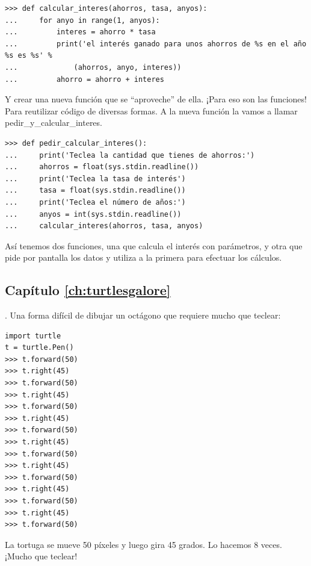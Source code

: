 \begin{listing}
\begin{verbatim}
>>> def calcular_interes(ahorros, tasa, anyos):
...     for anyo in range(1, anyos):
...         interes = ahorro * tasa
...         print('el interés ganado para unos ahorros de %s en el año %s es %s' % 
...             (ahorros, anyo, interes))
...         ahorro = ahorro + interes
\end{verbatim}
\end{listing}

\noindent
Y crear una nueva función que se ``aproveche'' de ella. ¡Para eso son las funciones! Para reutilizar código de diversas formas. A la nueva función la vamos a llamar pedir\_y\_calcular\_interes.

\begin{listing}
\begin{verbatim}
>>> def pedir_calcular_interes():
...     print('Teclea la cantidad que tienes de ahorros:')
...     ahorros = float(sys.stdin.readline())
...     print('Teclea la tasa de interés')
...     tasa = float(sys.stdin.readline())
...     print('Teclea el número de años:')
...     anyos = int(sys.stdin.readline())
...     calcular_interes(ahorros, tasa, anyos)
\end{verbatim}
\end{listing}

\noindent
Así tenemos dos funciones, una que calcula el interés con parámetros, y otra que pide por pantalla los datos y utiliza a la primera para efectuar los cálculos.

\subsection*{Capítulo \ref{ch:turtlesgalore}}

. Una forma difícil de dibujar un octágono que requiere mucho que teclear:

\begin{listing}
\begin{verbatim}
import turtle
t = turtle.Pen()
>>> t.forward(50)
>>> t.right(45)
>>> t.forward(50)
>>> t.right(45)
>>> t.forward(50)
>>> t.right(45)
>>> t.forward(50)
>>> t.right(45)
>>> t.forward(50)
>>> t.right(45)
>>> t.forward(50)
>>> t.right(45)
>>> t.forward(50)
>>> t.right(45)
>>> t.forward(50)
\end{verbatim}
\end{listing}

\noindent
La tortuga se mueve 50 píxeles y luego gira 45 grados.   Lo hacemos 8 veces.   ¡Mucho que teclear!

